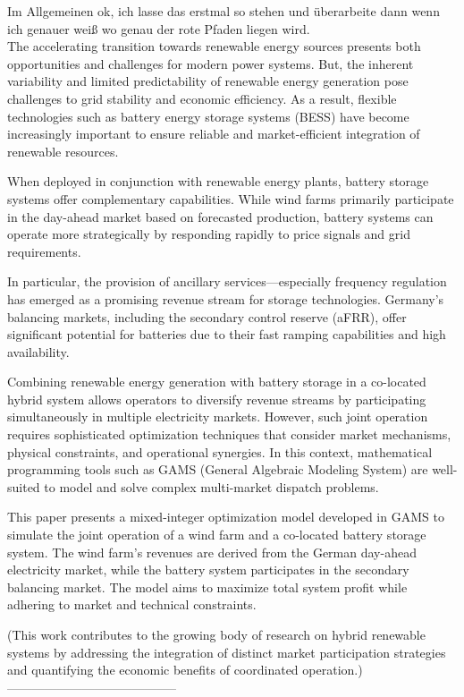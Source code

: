 Im Allgemeinen ok, ich lasse das erstmal so stehen und überarbeite dann wenn ich genauer weiß wo genau der rote Pfaden liegen wird.\\


The accelerating transition towards renewable energy sources presents both opportunities and challenges for modern
power systems. But, the inherent variability and limited predictability of renewable energy generation pose
challenges to grid stability and economic efficiency. As a result, flexible technologies such as battery energy
storage systems (BESS) have become increasingly important to ensure reliable and market-efficient integration of
renewable resources.

When deployed in conjunction with renewable energy plants, battery storage systems offer complementary capabilities.
While wind farms primarily participate in the day-ahead market based on forecasted production,
battery systems can operate more strategically by responding rapidly to price signals and grid requirements.


In particular, the provision of ancillary services—especially frequency regulation has emerged as a promising
revenue stream for storage technologies. Germany's balancing markets, including the secondary
control reserve (aFRR), offer significant potential for batteries due to their fast ramping capabilities and
high availability.

Combining renewable energy generation with battery storage in a co-located hybrid system allows operators to diversify
revenue streams by participating simultaneously in multiple electricity markets.
However, such joint operation
requires sophisticated optimization techniques that consider market mechanisms, physical constraints,
and operational synergies. In this context, mathematical programming tools such as GAMS (General Algebraic Modeling System)
are well-suited to model and solve complex multi-market dispatch problems.

This paper presents a mixed-integer optimization model developed in GAMS to simulate the joint operation of a
wind farm and a co-located battery storage system. The wind farm's revenues are derived from the German day-ahead
electricity market, while the battery system participates in the secondary balancing market.
The model aims to maximize total system profit while adhering to market and technical constraints.

(This work contributes to the growing body of research on hybrid renewable systems by addressing the
integration of distinct market participation strategies and quantifying the economic benefits of coordinated operation.)
-----------------------------------------\\

